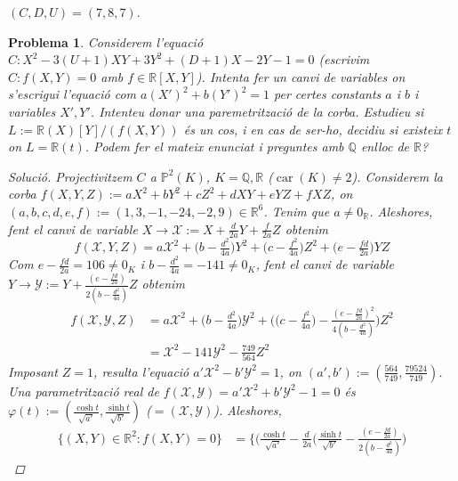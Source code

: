 \documentclass[compress]{article}
\newtheorem{problema}{Problema}
\theoremstyle{definition}
\DeclareMathOperator{\car}{car}
\begin{document}
\pagestyle{fancy}
$(C,D,U)=(7,8,7)$.
\begin{problema}
    Considerem l'equació $C:X^{2}-3(U+1)XY+3Y^{2}+(D+1)X-2Y-1=0$ (escrivim $C:f(X,Y)=0$ amb $f\in\mathbb{R}[X,Y]$). Intenta fer un canvi de variables on s'escrigui l'equació com $a(X')^{2}+b(Y')^{2}=1$ per certes constants $a$ i $b$ i variables $X',Y'$. Intenteu donar una paremetrització de la corba. Estudieu si $L:=\mathbb{R}(X)[Y]/(f(X,Y))$ és un cos, i en cas de ser-ho, decidiu si existeix $t$ on $L=\mathbb{R}(t)$. Podem fer el mateix enunciat i preguntes amb $\mathbb{Q}$ enlloc de $\mathbb{R}$?
    \begin{proof}[Solució]
        Projectivitzem $C$ a $\mathbb{P}^{2}(K)$, $K=\mathbb{Q},\mathbb{R}$ ($\car(K)\neq2$). Considerem la corba $f(X,Y,Z):=aX^{2}+bY^{2}+cZ^{2}+dXY+eYZ+fXZ$, on $(a,b,c,d,e,f):=(1,3,-1,-24,-2,9)\in\mathbb{R}^{6}$. Tenim que $a\neq0_{\mathbb{R}}$. Aleshores, fent el canvi de variable $X\rightarrow\mathscr{X}:=X+\frac{d}{2a}Y+\frac{f}{2a}Z$ obtenim
        \begin{equation*}
            f(\mathscr{X},Y,Z)
            =a\mathscr{X}^{2}
            +\big(b-\tfrac{d^{2}}{4a}\big)Y^{2}
            +\big(c-\tfrac{f^{2}}{4a}\big)Z^{2}
            +\big(e-\tfrac{fd}{2a}\big)YZ
        \end{equation*}
        Com $e-\frac{fd}{2a}=106\neq0_{K}$ i $b-\frac{d^{2}}{4a}=-141\neq0_{K}$, fent el canvi de variable $Y\rightarrow\mathscr{Y}:=Y+\frac{(e-\frac{fd}{2a})}{2(b-\frac{d^{2}}{4a})}Z$ obtenim
        \begin{align*}
            f(\mathscr{X},\mathscr{Y},Z)
            &=a\mathscr{X}^{2}
            +\big(b-\tfrac{d^{2}}{4a}\big)\mathscr{Y}^{2}
            +\big(\big(c-\tfrac{f^{2}}{4a}\big)-\tfrac{(e-\frac{fd}{2a})^{2}}{4(b-\frac{d^{2}}{4a})}\big)Z^{2}\\
            &=\mathscr{X}^{2}-141\mathscr{Y}^{2}-\tfrac{749}{564}Z^{2}
        \end{align*}
        Imposant $Z=1$, resulta l'equació $a'\mathscr{X}^{2}-b'\mathscr{Y}^{2}=1$, on $(a',b'):=(\frac{564}{749},\frac{79524}{749})$.\newline
        Una parametrització real de $f(\mathscr{X},\mathscr{Y})=a'\mathscr{X}^{2}+b'\mathscr{Y}^{2}-1=0$ és $\varphi(t):=(\frac{\cosh{t}}{\sqrt{a'}},\frac{\sinh{t}}{\sqrt{b'}})$ ($=(\mathscr{X},\mathscr{Y})$). Aleshores,
        \begin{align*}
            \{(X,Y)\in\mathbb{R}^{2}:f(X,Y)=0\}
            &=\{\big(\tfrac{\cosh{t}}{\sqrt{a'}}
            -\tfrac{d}{2a}\big(\tfrac{\sinh{t}}{\sqrt{b'}}-\tfrac{(e-\frac{fd}{2a})}{2(b-\frac{d^{2}}{4a})}\big)

\end{align*}
\end{proof}
\end{problema}
\end{document}
